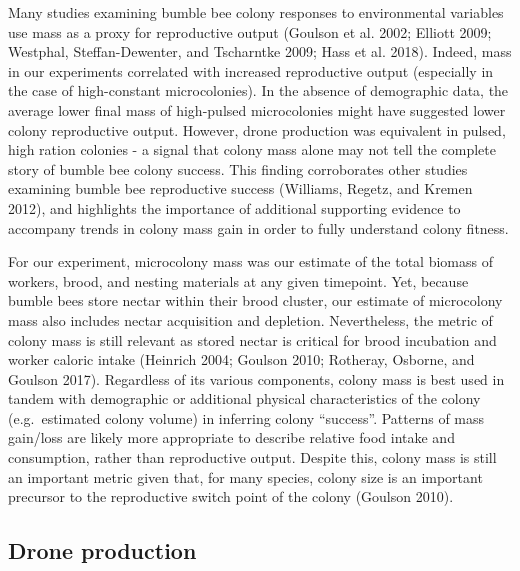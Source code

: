\documentclass[11pt,]{article}
\begin{document}
Many studies examining bumble bee colony responses to environmental
variables use mass as a proxy for reproductive output (Goulson et al.
2002; Elliott 2009; Westphal, Steffan-Dewenter, and Tscharntke 2009;
Hass et al. 2018). Indeed, mass in our experiments correlated with
increased reproductive output (especially in the case of high-constant
microcolonies). In the absence of demographic data, the average lower
final mass of high-pulsed microcolonies might have suggested lower
colony reproductive output. However, drone production was equivalent in
pulsed, high ration colonies - a signal that colony mass alone may not
tell the complete story of bumble bee colony success. This finding
corroborates other studies examining bumble bee reproductive success
(Williams, Regetz, and Kremen 2012), and highlights the importance of
additional supporting evidence to accompany trends in colony mass gain
in order to fully understand colony fitness.

For our experiment, microcolony mass was our estimate of the total
biomass of workers, brood, and nesting materials at any given timepoint.
Yet, because bumble bees store nectar within their brood cluster, our
estimate of microcolony mass also includes nectar acquisition and
depletion. Nevertheless, the metric of colony mass is still relevant as
stored nectar is critical for brood incubation and worker caloric intake
(Heinrich 2004; Goulson 2010; Rotheray, Osborne, and Goulson 2017).
Regardless of its various components, colony mass is best used in tandem
with demographic or additional physical characteristics of the colony
(e.g.~estimated colony volume) in inferring colony ``success''. Patterns
of mass gain/loss are likely more appropriate to describe relative food
intake and consumption, rather than reproductive output. Despite this,
colony mass is still an important metric given that, for many species,
colony size is an important precursor to the reproductive switch point
of the colony (Goulson 2010).

\hypertarget{drone-production}{%
\subsection{Drone production}\label{drone-production}}
\end{document}
